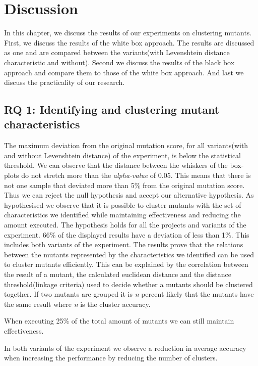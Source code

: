\documentclass[../main]{subfiles}
\begin{document}
\chapter{Discussion}
\label{ch:discussion}
In this chapter, we discuss the results of our experiments on clustering mutants.
First, we discuss the results of the white box approach. 
The results are discussed as one and are compared between the variants(with Levenshtein distance characteristic and without).
Second we discuss the results of the black box approach and compare them to those of the white box approach.
And last we discuss the practicality of our research.

\section{RQ 1: Identifying and clustering mutant characteristics}
The maximum deviation from the original mutation score, for all variants(with and without Levenshtein distance) of the experiment, is below the statistical threshold.
We can observe that the distance between the whiskers of the box-plots do not stretch more than the \textit{alpha-value} of 0.05.
This means that there is not one sample that deviated more than 5\% from the original mutation score.
Thus we can reject the null hypothesis and accept our alternative hypothesis.
As hypothesised we observe that it is possible to cluster mutants with the set of characteristics we identified while maintaining effectiveness and reducing the amount executed.
The hypothesis holds for all the projects and variants of the experiment.
66\% of the displayed results have a deviation of less than 1\%. 
This includes both variants of the experiment.
\newline
The results prove that the relations between the mutants represented by the characteristics we identified can be used to cluster mutants efficiently. 
This can be explained by the correlation between the result of a mutant, the calculated euclidean distance and the distance threshold(linkage criteria) used to decide whether a mutants should be clustered together.
\newline
If two mutants are grouped it is \textit{n} percent likely that the mutants have the same result where \textit{n} is the cluster accuracy.
\begin{finding}
    When executing 25\% of the total amount of mutants we can still maintain effectiveness.
\end{finding}
In both variants of the experiment we observe a reduction in average accuracy when increasing the performance by reducing the number of clusters.
\end{document}
